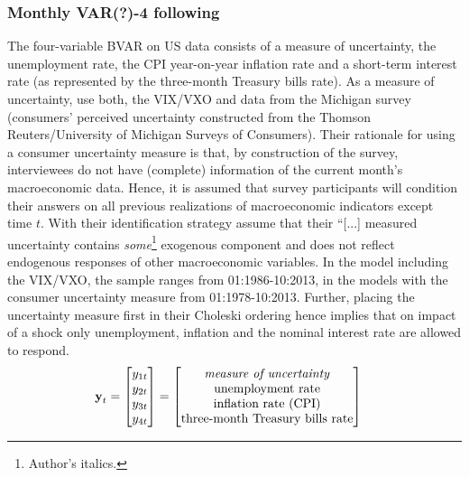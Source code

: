 \documentclass[a4paper,11pt,listof=nochaptergap,oneside,pointednumbers,bibtotoc,bigheadings,liststotoc,hidelinks]{scrbook}
\theoremstyle{mysatz}
\theoremstyle{mydefinition}
\theoremstyle{mytheorem}
\theoremstyle{mybemerkung}
\newcommand{\vect}[1]{\boldsymbol{\mathbf{#1}}}
\begin{document}
\subsubsection{Monthly VAR(?)-4 following \citet{leducandliu:16}}
The four-variable BVAR on US data consists of a measure of uncertainty, the unemployment rate, the CPI year-on-year inflation rate and a short-term interest rate (as represented by the three-month Treasury bills rate). As a measure of uncertainty, \citet{leducandliu:16} use both, the VIX/VXO and data from the Michigan survey (consumers' perceived uncertainty constructed from the Thomson Reuters/University of Michigan Surveys of Consumers). Their rationale for using a consumer uncertainty measure is that, by construction of the survey, interviewees do not have (complete) information of the current month's macroeconomic data. Hence, it is assumed that survey participants will condition their answers on all previous realizations of macroeconomic indicators except time $t$. With their identification strategy \citet[p. 23]{leducandliu:16} assume that their ``[...] measured uncertainty contains \textit{some}\footnote{Author's italics.} exogenous component and does not reflect endogenous responses of other macroeconomic variables. In the model including the VIX/VXO, the sample ranges from 01:1986-10:2013, in the models with the consumer uncertainty measure from 01:1978-10:2013. Further, placing the uncertainty measure first in their Choleski ordering hence implies that on impact of a shock only unemployment, inflation and the nominal interest rate are allowed to respond.
\begin{equation} \label{eq:VAR22}
\begin{split}
\vect{y}_t & = 
 \begin{bmatrix} 
 		y_{1t} \\
		y_{2t} \\
		y_{3t} \\
		y_{4t}
	      \end{bmatrix} = 	      
	      \begin{bmatrix} \text{\textit{measure of uncertainty}} \\ 
				      \text{unemployment rate}\\ 
				      \text{inflation rate (CPI)}\\
				      \text{three-month Treasury bills rate}
	      \end{bmatrix}
\end{split}
\end{equation}
\end{document}
